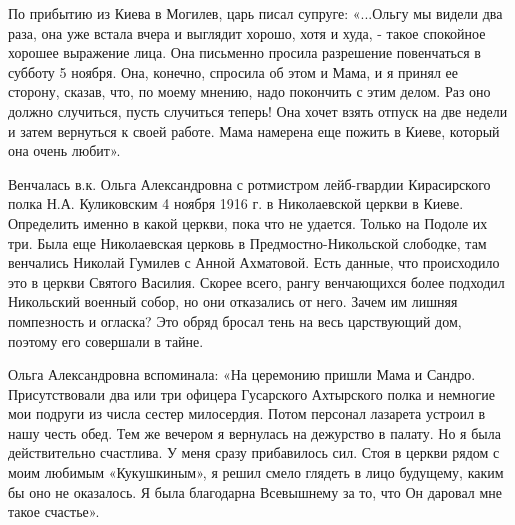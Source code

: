 По прибытию из Киева в Могилев, царь писал супруге: «...Ольгу мы видели два
раза, она уже встала вчера и выглядит хорошо, хотя и худа, - такое спокойное
хорошее выражение лица. Она письменно просила разрешение повенчаться в субботу
5 ноября. Она, конечно, спросила об этом и Мама, и я принял ее сторону, сказав,
что, по моему мнению, надо покончить с этим делом. Раз оно должно случиться,
пусть случиться теперь! Она хочет взять отпуск на две недели и затем вернуться
к своей работе. Мама намерена еще пожить в Киеве, который она очень любит».

Венчалась в.к. Ольга Александровна с ротмистром лейб-гвардии Кирасирского полка
Н.А. Куликовским 4 ноября 1916 г. в Николаевской церкви в Киеве. Определить
именно в какой церкви, пока что не удается. Только на Подоле их три. Была еще
Николаевская церковь в Предмостно-Никольской слободке, там венчались Николай
Гумилев с Анной Ахматовой. Есть данные, что происходило это в церкви Святого
Василия. Скорее всего, рангу венчающихся более подходил Никольский военный
собор, но они отказались от него. Зачем им лишняя помпезность и огласка? Это
обряд бросал тень на весь царствующий дом, поэтому его совершали в тайне. 

Ольга Александровна вспоминала: «На церемонию пришли Мама и Сандро.
Присутствовали два или три офицера Гусарского Ахтырского полка и немногие мои
подруги из числа сестер милосердия. Потом персонал лазарета устроил в нашу
честь обед. Тем же вечером я вернулась на дежурство в палату. Но я была
действительно счастлива. У меня сразу прибавилось сил. Стоя в церкви рядом с
моим любимым «Кукушкиным», я решил смело глядеть в лицо будущему, каким бы оно
не оказалось. Я была благодарна Всевышнему за то, что Он даровал мне такое
счастье». 

